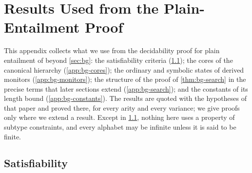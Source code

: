 
\section{Results Used from the Plain-Entailment Proof}\label{app:bg}

This appendix collects what we use from the decidability proof for plain
entailment of \citet{Zhao26} beyond \cref{sec:bg}: the satisfiability criteria
(\cref{app:bg-sat}); the cores of the
canonical hierarchy (\cref{app:bg-cores}); the ordinary and symbolic states
of derived monitors (\cref{app:bg-monitors}); the structure of the proof of
\cref{thm:bg-search} in the precise terms that later sections extend
(\cref{app:bg-search}); and the constants of its length bound
(\cref{app:bg-constants}). The results are quoted
with the hypotheses of that paper and proved there, for every arity and every
variance; we give proofs only where we extend a result. Except in
\cref{app:bg-sat}, nothing here uses a property of subtype constraints, and
every alphabet may be infinite unless it is said to be finite.

\subsection{Satisfiability}\label{app:bg-sat}

